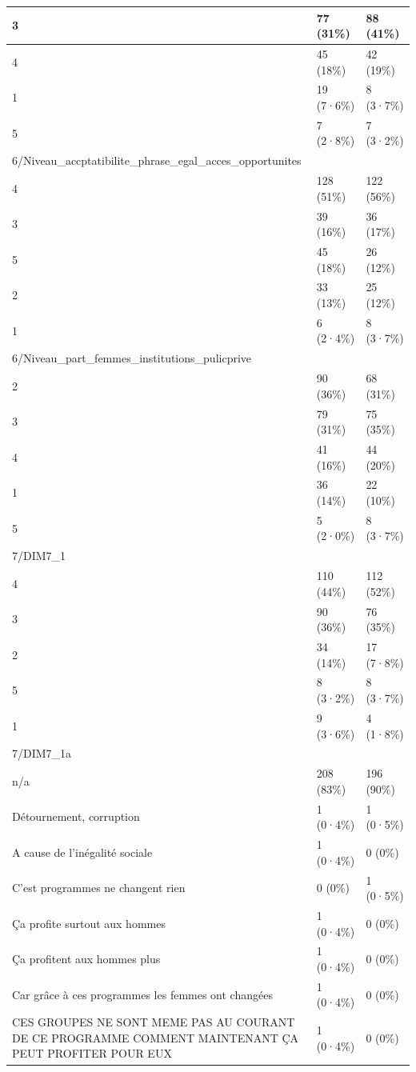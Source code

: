 \documentclass[
]{book}
\begin{document}
\begin{tabular}{l|l|l}
\hline
3 & 77 (31\%) & 88 (41\%)\\
\hline
4 & 45 (18\%) & 42 (19\%)\\
\hline
1 & 19 (7·6\%) & 8 (3·7\%)\\
\hline
5 & 7 (2·8\%) & 7 (3·2\%)\\
\hline
6/Niveau\_accptatibilite\_phrase\_egal\_acces\_opportunites &  & \\
\hline
4 & 128 (51\%) & 122 (56\%)\\
\hline
3 & 39 (16\%) & 36 (17\%)\\
\hline
5 & 45 (18\%) & 26 (12\%)\\
\hline
2 & 33 (13\%) & 25 (12\%)\\
\hline
1 & 6 (2·4\%) & 8 (3·7\%)\\
\hline
6/Niveau\_part\_femmes\_institutions\_pulicprive &  & \\
\hline
2 & 90 (36\%) & 68 (31\%)\\
\hline
3 & 79 (31\%) & 75 (35\%)\\
\hline
4 & 41 (16\%) & 44 (20\%)\\
\hline
1 & 36 (14\%) & 22 (10\%)\\
\hline
5 & 5 (2·0\%) & 8 (3·7\%)\\
\hline
7/DIM7\_1 &  & \\
\hline
4 & 110 (44\%) & 112 (52\%)\\
\hline
3 & 90 (36\%) & 76 (35\%)\\
\hline
2 & 34 (14\%) & 17 (7·8\%)\\
\hline
5 & 8 (3·2\%) & 8 (3·7\%)\\
\hline
1 & 9 (3·6\%) & 4 (1·8\%)\\
\hline
7/DIM7\_1a &  & \\
\hline
n/a & 208 (83\%) & 196 (90\%)\\
\hline
Détournement, corruption & 1 (0·4\%) & 1 (0·5\%)\\
\hline
A cause de l'inégalité sociale & 1 (0·4\%) & 0 (0\%)\\
\hline
C'est programmes ne changent rien & 0 (0\%) & 1 (0·5\%)\\
\hline
Ça profite surtout aux hommes & 1 (0·4\%) & 0 (0\%)\\
\hline
Ça profitent aux hommes plus & 1 (0·4\%) & 0 (0\%)\\
\hline
Car grâce à ces programmes les femmes ont changées & 1 (0·4\%) & 0 (0\%)\\
\hline
CES GROUPES NE SONT MEME PAS AU COURANT DE CE PROGRAMME COMMENT MAINTENANT ÇA PEUT PROFITER POUR EUX & 1 (0·4\%) & 0 (0\%)\\

\end{tabular}
\end{document}
